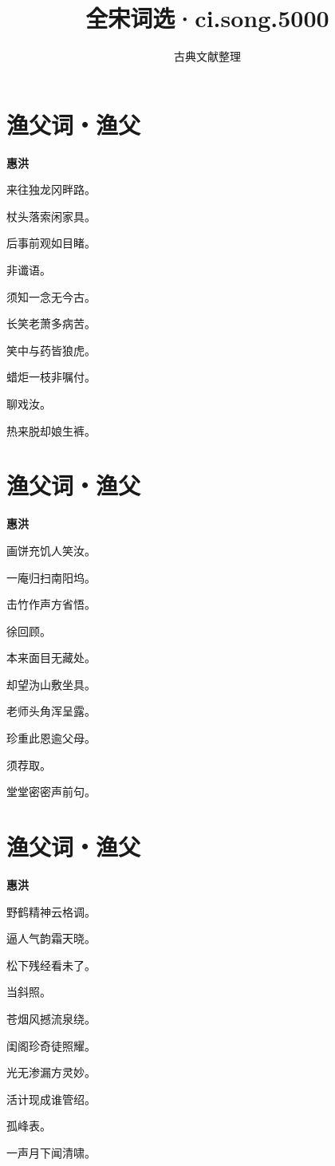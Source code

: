 \documentclass[12pt,a4paper]{ctexbook}
\title{全宋词选·ci.song.5000}
\author{古典文献整理}
\date{}
\begin{document}
\maketitle
\tableofcontents
\newpage
\section{渔父词・渔父}
\textbf{惠洪}\par\vspace{0.5em}
来往独龙冈畔路。\par
杖头落索闲家具。\par
后事前观如目睹。\par
非谶语。\par
须知一念无今古。\par
长笑老萧多病苦。\par
笑中与药皆狼虎。\par
蜡炬一枝非嘱付。\par
聊戏汝。\par
热来脱却娘生裤。\par

\section{渔父词・渔父}
\textbf{惠洪}\par\vspace{0.5em}
画饼充饥人笑汝。\par
一庵归扫南阳坞。\par
击竹作声方省悟。\par
徐回顾。\par
本来面目无藏处。\par
却望沩山敷坐具。\par
老师头角浑呈露。\par
珍重此恩逾父母。\par
须荐取。\par
堂堂密密声前句。\par

\section{渔父词・渔父}
\textbf{惠洪}\par\vspace{0.5em}
野鹤精神云格调。\par
逼人气韵霜天晓。\par
松下残经看未了。\par
当斜照。\par
苍烟风撼流泉绕。\par
闺阁珍奇徒照耀。\par
光无渗漏方灵妙。\par
活计现成谁管绍。\par
孤峰表。\par
一声月下闻清啸。\par
\end{document}
